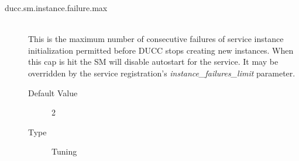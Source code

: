 \begin{description}
      \item[ducc.sm.instance.failure.max] \hfill \\
        This is the maximum number of consecutive failures of service instance initialization 
        permitted before DUCC stops creating new instances.  When this cap is hit the SM
        will disable autostart for the service.  It may be overridden by the service
        registration's {\em instance\_failures\_limit} parameter.
        \begin{description}
          \item[Default Value] 2
          \item[Type] Tuning 
        \end{description}
        
      \end{description}
      

